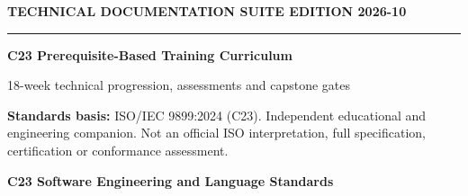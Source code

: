 \documentclass[10pt,letterpaper,oneside]{report}
\begin{document}
\hypersetup{pageanchor=false}%
\begin{titlepage}
\color{ink}\vspace*{1.2in}
{\sffamily\small\color{accent}\bfseries TECHNICAL DOCUMENTATION SUITE \hfill EDITION 2026-10}\par
\vspace{.3in}\rule{\linewidth}{1.5pt}\par\vspace{.22in}
{\Huge\bfseries C23 Prerequisite-Based Training Curriculum}\par\vspace{.22in}
{\Large\color{grayblue}18-week technical progression, assessments and capstone gates}\par\vspace{.4in}
\begin{keybox}\textbf{Standards basis:} ISO/IEC 9899:2024 (C23). Independent educational and engineering companion. Not an official ISO interpretation, full specification, certification or conformance assessment.\end{keybox}
\vfill{\large\bfseries C23 Software Engineering and Language Standards}\par{}\par
\end{titlepage}\hypersetup{pageanchor=true}
\tableofcontents\clearpage{}
\end{document}
